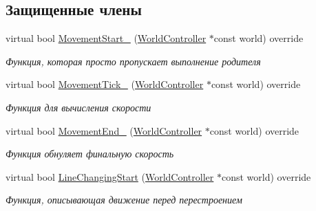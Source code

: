 \subsection*{Защищенные члены}
\begin{DoxyCompactItemize}
\item 
virtual bool \hyperlink{classrtm_1_1_car_object_abbedfee1e8db8b12ea912d77efc4805c}{Movement\+Start\+\_\+} (\hyperlink{classrtm_1_1_world_controller}{World\+Controller} $\ast$const world) override
\begin{DoxyCompactList}\small\item\em Функция, которая просто пропускает выполнение родителя \end{DoxyCompactList}\item 
virtual bool \hyperlink{classrtm_1_1_car_object_abe89fea4893e244d9f6fb17c596b5ae0}{Movement\+Tick\+\_\+} (\hyperlink{classrtm_1_1_world_controller}{World\+Controller} $\ast$const world) override
\begin{DoxyCompactList}\small\item\em Функция для вычисления скорости \end{DoxyCompactList}\item 
virtual bool \hyperlink{classrtm_1_1_car_object_a24354013f953386699bbb3f4464adb0c}{Movement\+End\+\_\+} (\hyperlink{classrtm_1_1_world_controller}{World\+Controller} $\ast$const world) override
\begin{DoxyCompactList}\small\item\em Функция обнуляет финальную скорость \end{DoxyCompactList}\item 
virtual bool \hyperlink{classrtm_1_1_car_object_a34063664a03d36d1308c80e064d1ae61}{Line\+Changing\+Start} (\hyperlink{classrtm_1_1_world_controller}{World\+Controller} $\ast$const world) override
\begin{DoxyCompactList}\small\item\em Функция, описывающая движение перед перестроением \end{DoxyCompactList}\end{DoxyCompactItemize}
